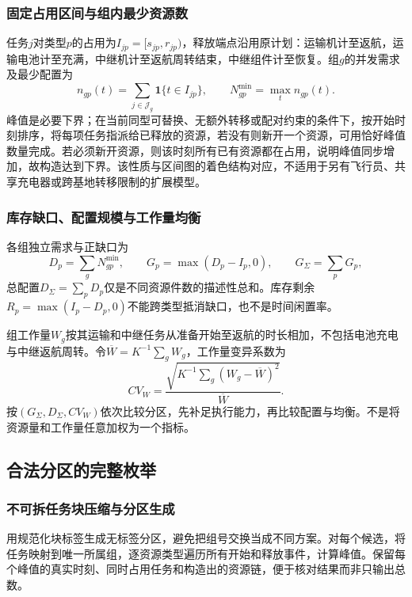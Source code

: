 \subsubsection{固定占用区间与组内最少资源数}
任务$j$对类型$p$的占用为$I_{jp}=[s_{jp},r_{jp})$，释放端点沿用原计划：运输机计至返航，运输电池计至充满，中继机计至返航周转结束，中继组件计至恢复。组$g$的并发需求及最少配置为
\begin{equation}
 n_{gp}(t)=\sum_{j\in\mathcal J_g}\mathbf1\{t\in I_{jp}\},\qquad
 N_{gp}^{\min}=\max_tn_{gp}(t).
\label{eq:q4_peak}
\end{equation}
峰值是必要下界；在当前同型可替换、无额外转移或配对约束的条件下，按开始时刻排序，将每项任务指派给已释放的资源，若没有则新开一个资源，可用恰好峰值数量完成。若必须新开资源，则该时刻所有已有资源都在占用，说明峰值同步增加，故构造达到下界。该性质与区间图的着色结构对应\cite{fulkerson1965interval}，不适用于另有飞行员、共享充电器或跨基地转移限制的扩展模型。

\subsubsection{库存缺口、配置规模与工作量均衡}
各组独立需求与正缺口为
\begin{equation}
 D_p=\sum_gN_{gp}^{\min},\qquad G_p=\max(D_p-I_p,0),\qquad
 G_\Sigma=\sum_pG_p,
\label{eq:q4_gap}
\end{equation}
总配置$D_\Sigma=\sum_pD_p$仅是不同资源件数的描述性总和。库存剩余$R_p=\max(I_p-D_p,0)$不能跨类型抵消缺口，也不是时间闲置率。

组工作量$W_g$按其运输和中继任务从准备开始至返航的时长相加，不包括电池充电与中继返航周转。令$\overline W=K^{-1}\sum_gW_g$，工作量变异系数为
\begin{equation}
 CV_W=\frac{\sqrt{K^{-1}\sum_g(W_g-\overline W)^2}}{\overline W}.
\label{eq:q4_cv}
\end{equation}
按$(G_\Sigma,D_\Sigma,CV_W)$依次比较分区，先补足执行能力，再比较配置与均衡。不是将资源量和工作量任意加权为一个指标。

\subsection{合法分区的完整枚举}
\subsubsection{不可拆任务块压缩与分区生成}
用规范化块标签生成无标签分区，避免把组号交换当成不同方案。对每个候选，将任务映射到唯一所属组，逐资源类型遍历所有开始和释放事件，计算峰值。保留每个峰值的真实时刻、同时占用任务和构造出的资源链，便于核对结果而非只输出总数。

